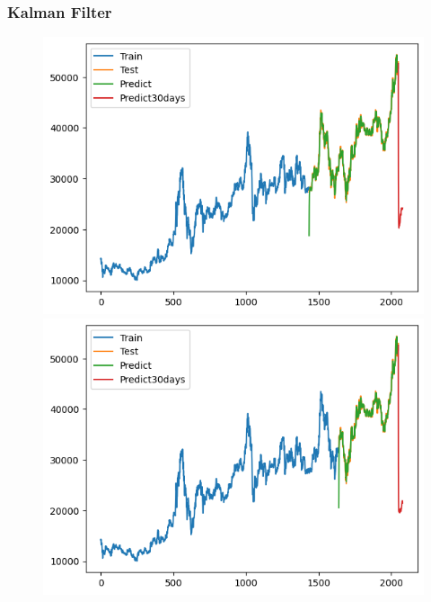 \subsubsection{Kalman Filter}
\begin{figure}[H]
    \centering
    \begin{minipage}{0.15\textwidth}
    \centering
    \includegraphics[width=1\textwidth]{resources/chapter-5/result/KF_BIDV_7_3.png}
    \end{minipage}
    \hfill
    \begin{minipage}{0.15\textwidth}
    \centering
    \includegraphics[width=1\textwidth]{resources/chapter-5/result/KF_BIDV_8_2.png}
    \end{minipage}
    \hfill
        \begin{minipage}{0.15\textwidth}

\end{minipage}
\end{figure}
